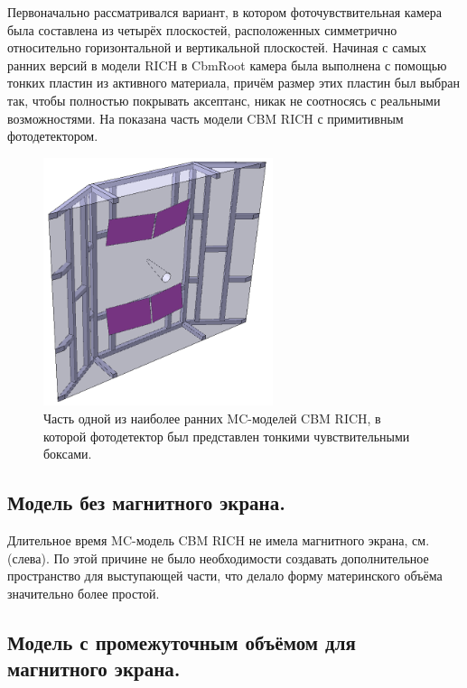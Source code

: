 Первоначально рассматривался вариант, в котором фоточувствительная камера была составлена из четырёх плоскостей, расположенных симметрично относительно горизонтальной и вертикальной плоскостей. Начиная с самых ранних версий в модели RICH в CbmRoot камера была выполнена с помощью тонких пластин из активного материала, причём размер этих пластин был выбран так, чтобы полностью покрывать аксептанс, никак не соотносясь с реальными возможностями. На  показана часть модели CBM RICH с примитивным фотодетектором.

\begin{figure}[H]
\centering
\includegraphics[width=0.6\textwidth]{pictures/PrimitivePhotodetector.png}
\caption{Часть одной из наиболее ранних MC-моделей CBM RICH, в которой фотодетектор был представлен тонкими чувствительными боксами.}
\label{fig:PrimitivePhotodetector}
\end{figure}

\subsection{Модель без магнитного экрана.}\label{sec:secNoMagScreen}

Длительное время MC-модель CBM RICH не имела магнитного экрана, см. (слева). По этой причине не было необходимости создавать дополнительное пространство для выступающей части, что делало форму материнского объёма значительно более простой.

\subsection{Модель с промежуточным объёмом для магнитного экрана.}\label{sec:secInterVolMagScreen}

